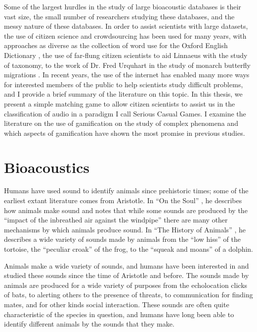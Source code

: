 Some of the largest hurdles in the study of large bioacoustic
databases is their vast size, the small number of researchers studying
these databases, and the messy nature of these databases.  In order to
assist scientists with large datasets, the use of citizen science and
crowdsourcing has been used for many years, with approaches as diverse
as the collection of word use for the Oxford English
Dictionary\cite{brody1999professor} \cite{goodchild2007world}, the use
of far-flung citizen scientists to aid Linnaeus with the study of
taxonomy\cite{linnaeus1758systema}, to the work of Dr. Fred Urquhart
in the study of monarch butterfly migrations\cite{howard2009fall}
\cite{oberhauser2008citizen}.  In recent years, the use of the
internet has enabled many more ways for interested members of the
public to help scientists study difficult problems, and I provide a
brief summary of the literature on this topic.  In this thesis, we
present a simple matching game to allow citizen scientists to assist
us in the classification of audio in a paradigm I call Serious Casual
Games.  I examine the literature on the use of gamification on the
study of complex phenomena and which aspects of gamification have shown
the most promise in previous studies.



\section{Bioacoustics}
\label{section:relatedWork:bioacoustics}

Humans have used sound to identify animals since prehistoric times;
some of the earliest extant literature comes from Aristotle.  In ``On
the Soul'' \cite{aristotle1}, he describes how animals make sound and
notes that while some sounds are produced by the ``impact of the
inbreathed air against the windpipe'' there are many other mechanisms
by which animals produce sound.  In ``The History of Animals''
\cite{aristotle2}, he describes a wide variety of sounds made by
animals from the ``low hiss'' of the tortoise, the ``peculiar croak''
of the frog, to the ``squeak and moans'' of a dolphin.

Animals make a wide variety of sounds, and humans have been interested
in and studied these sounds since the time of Aristotle and before.
The sounds made by animals are produced for a wide variety of purposes
from the echolocation clicks of bats, to alerting others to the
presence of threats, to communication for finding mates, and for other
kinds social interaction.  These sounds are often quite characteristic
of the species in question, and humans have long been able to identify
different animals by the sounds that they make.

